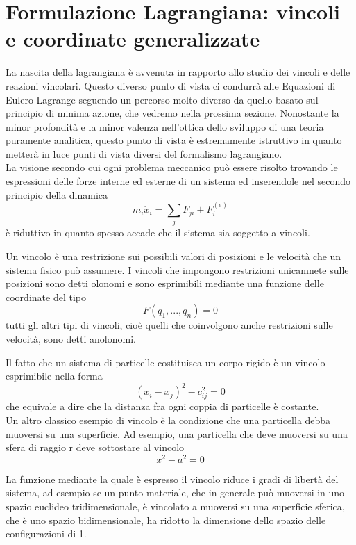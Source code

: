 \documentclass[
10pt, %
a4paper, %
oneside, %
headinclude,footinclude, %
BCOR5mm, %
]{scrartcl}
\begin{document}
\section{Formulazione Lagrangiana: vincoli e coordinate generalizzate}
La nascita della lagrangiana è avvenuta in rapporto allo studio dei vincoli e delle reazioni vincolari. Questo diverso punto di vista ci condurrà alle Equazioni di Eulero-Lagrange seguendo un percorso molto diverso da quello basato sul principio di minima azione, che vedremo nella prossima sezione. Nonostante la minor profondità e la minor valenza nell'ottica dello sviluppo di una teoria puramente analitica, questo punto di vista è estremamente istruttivo in quanto metterà in luce punti di vista diversi del formalismo lagrangiano.\\
La visione secondo cui ogni problema meccanico può essere risolto trovando le espressioni delle forze interne ed esterne di un sistema ed inserendole nel secondo principio della dinamica
\[m_i\ddot{x}_i = \sum_jF_{ji}+F_i^{(e)}\]
è riduttivo in quanto spesso accade che il sistema sia soggetto a vincoli.
\begin{definizione}[Vincolo]
	Un vincolo è una restrizione sui possibili valori di posizioni e le velocità che un sistema fisico può assumere. I vincoli che impongono restrizioni unicamnete sulle posizioni sono detti olonomi e sono esprimibili mediante una funzione delle coordinate del tipo
	\[F(q_1, ..., q_n) = 0\]
	tutti gli altri tipi di vincoli, cioè quelli che coinvolgono anche restrizioni sulle velocità, sono detti anolonomi.
\end{definizione}
\begin{esempio}
	Il fatto che un sistema di particelle costituisca un corpo rigido è un vincolo esprimibile nella forma
	\[(x_i-x_j)^2-c_{ij}^2=0\]
	che equivale a dire che la distanza fra ogni coppia di particelle è costante.\\
	Un altro classico esempio di vincolo è la condizione che una particella debba muoversi su una superficie. Ad esempio, una particella che deve muoversi su una sfera di raggio r deve sottostare al vincolo
	\[x^2-a^2 = 0\]
\end{esempio}
La funzione mediante la quale è espresso il vincolo riduce i gradi di libertà del sistema, ad esempio se un punto materiale, che in generale può muoversi in uno spazio euclideo tridimensionale, è vincolato a muoversi su una superficie sferica, che è uno spazio bidimensionale, ha ridotto la dimensione dello spazio delle configurazioni di 1. 
\end{document}
